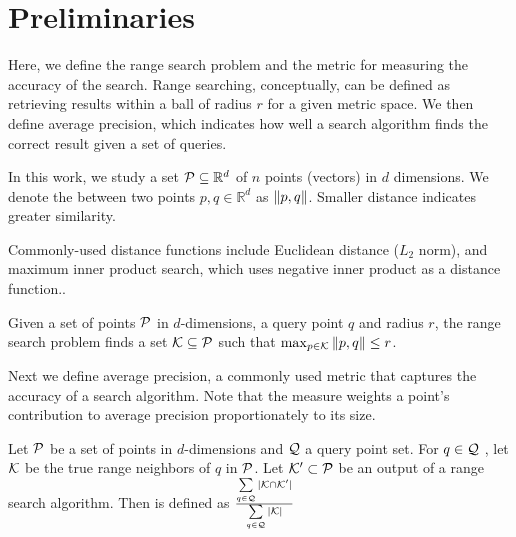 \section{Preliminaries}\label{sec:prelim}

Here, we define the range search problem and the metric for measuring the accuracy of the search. Range searching, conceptually, can be defined as retrieving results within a ball of radius $r$ for a given metric space. We then define average precision, which indicates how well a search algorithm finds the correct result given a set of queries.


 In this work,
we study a set $\mathcal{P}\subseteq \mathbb{R}^{d}$ of $n$ points (vectors)
in $d$ dimensions.
We denote the  between two points $p,q\in
\mathbb{R}^{d}$ as ${\lVert p,q\rVert}$.  Smaller distance indicates greater
similarity.

Commonly-used distance functions include Euclidean distance ($L_2$
norm), and maximum inner product search, which uses negative inner product as a distance function..


\begin{definition}
	Given a set of points $\mathcal{P}$ in $d$-dimensions, a query point $q$ and radius $r$, the range search problem finds a set $\mathcal{K}\subseteq \mathcal{P}$
	such that $\max_{p\in \mathcal{K}} {\lVert p,q\rVert} \le r$.
\end{definition}


Next we define average precision, a commonly used metric that captures the accuracy of a search algorithm. Note that the measure weights a point's contribution to average precision proportionately to its size. 

\begin{definition}
	Let $\mathcal{P}$ be a set of points in $d$-dimensions and $\mathcal{Q}$ a query point set. For $q \in \mathcal{Q}$ , let $\mathcal{K}$ be the true range neighbors of $q$ in $\mathcal{P}$. Let $\mathcal{K}' \subset \mathcal{P}$ be an output of a range search algorithm. Then  is defined as $\frac{\sum\limits_{q \in \mathcal{Q}}|\mathcal{K} \cap \mathcal{K}'|}{\sum\limits_{q \in \mathcal{Q}}|\mathcal{K}|}$ 
\end{definition}

